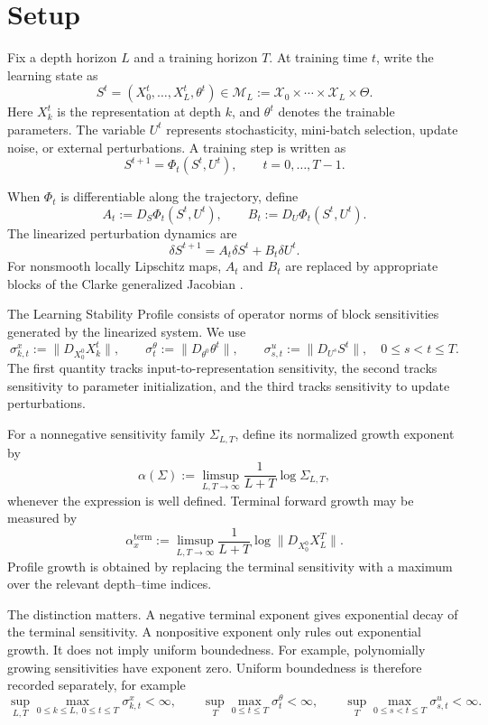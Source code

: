 \documentclass{article}
\numberwithin{equation}{section}
\begin{document}
\section{Setup}
\label{sec:setup}

Fix a depth horizon \(L\) and a training horizon \(T\). At training time \(t\),
write the learning state as
\[
S^t
=
(X_0^t,\ldots,X_L^t,\theta^t)
\in
\mathcal{M}_L
:=
\mathcal{X}_0\times\cdots\times\mathcal{X}_L\times\Theta .
\]
Here \(X_k^t\) is the representation at depth \(k\), and \(\theta^t\) denotes the
trainable parameters. The variable \(U^t\) represents stochasticity, mini-batch
selection, update noise, or external perturbations. A training step is written as
\[
S^{t+1}
=
\Phi_t(S^t,U^t),
\qquad
t=0,\ldots,T-1 .
\]

When \(\Phi_t\) is differentiable along the trajectory, define
\[
A_t:=D_S\Phi_t(S^t,U^t),
\qquad
B_t:=D_U\Phi_t(S^t,U^t).
\]
The linearized perturbation dynamics are
\[
\delta S^{t+1}
=
A_t\delta S^t+B_t\delta U^t .
\]
For nonsmooth locally Lipschitz maps, \(A_t\) and \(B_t\) are replaced by
appropriate blocks of the Clarke generalized Jacobian
\cite{Clarke1990Optimization,Clarke1998Nonsmooth}.

The Learning Stability Profile consists of operator norms of block sensitivities
generated by the linearized system. We use
\[
\sigma^x_{k,t}
:=
\bigl\|D_{X_0^0}X_k^t\bigr\|,
\qquad
\sigma^\theta_t
:=
\bigl\|D_{\theta^0}\theta^t\bigr\|,
\qquad
\sigma^u_{s,t}
:=
\bigl\|D_{U^s}S^t\bigr\|,
\quad
0\le s<t\le T .
\]
The first quantity tracks input-to-representation sensitivity, the second
tracks sensitivity to parameter initialization, and the third tracks sensitivity
to update perturbations.

For a nonnegative sensitivity family \(\Sigma_{L,T}\), define its normalized
growth exponent by
\[
\alpha(\Sigma)
:=
\limsup_{L,T\to\infty}
\frac{1}{L+T}\log \Sigma_{L,T},
\]
whenever the expression is well defined. Terminal forward growth may be measured
by
\[
\alpha_x^{\mathrm{term}}
:=
\limsup_{L,T\to\infty}
\frac{1}{L+T}
\log
\bigl\|D_{X_0^0}X_L^T\bigr\|.
\]
Profile growth is obtained by replacing the terminal sensitivity with a maximum
over the relevant depth--time indices.

The distinction matters. A negative terminal exponent gives exponential decay
of the terminal sensitivity. A nonpositive exponent only rules out exponential
growth. It does not imply uniform boundedness. For example, polynomially growing
sensitivities have exponent zero. Uniform boundedness is therefore recorded
separately, for example
\[
\sup_{L,T}\max_{0\le k\le L,\;0\le t\le T}\sigma^x_{k,t}<\infty,
\qquad
\sup_T\max_{0\le t\le T}\sigma^\theta_t<\infty,
\qquad
\sup_T\max_{0\le s<t\le T}\sigma^u_{s,t}<\infty .
\]
\end{document}
